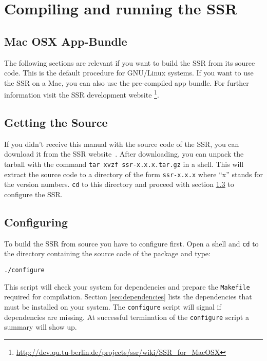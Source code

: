 \section{Compiling and running the SSR}

\subsection{Mac OSX App-Bundle}

The following sections are relevant if you want to build the SSR from its source
code. This is the default procedure for GNU/Linux systems. If you want to use
the SSR on a Mac, you can also use the pre-compiled app bundle.
For further information visit the SSR development website%
\footnote{\url{http://dev.qu.tu-berlin.de/projects/ssr/wiki/SSR_for_MacOSX}}.

\subsection{Getting the Source}

If you didn't receive this manual with the source code of the SSR, you can
download it from the SSR website~\cite{ssr}. After downloading, you can unpack the tarball with
the command \verb+tar xvzf ssr-x.x.x.tar.gz+ in a shell. This will extract the
source code to a directory of the form \verb+ssr-x.x.x+ where ``x'' stands for
the version numbers.  \verb+cd+ to this directory and proceed with section
\ref{sec:configuring} to configure the SSR.

\subsection{Configuring}
\label{sec:configuring}

To build the SSR from source you have to configure first. Open a shell and
\verb+cd+ to the directory containing the source code
of the package and type:

\begin{verbatim}
./configure
\end{verbatim}

This script will check your system for dependencies and prepare the
\verb+Makefile+ required for compilation. Section \ref{sec:dependencies} lists
the dependencies that must be installed on your system. The \texttt{configure} script
will signal if dependencies are missing. At successful termination of the 
\texttt{configure} script a summary will show up.

